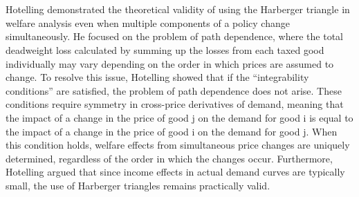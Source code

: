 \documentclass[a4paper]{article}
\begin{document}
\section{} %
Hotelling demonstrated the theoretical validity of using the Harberger triangle in welfare analysis even when multiple components of a policy change simultaneously.
He focused on the problem of path dependence, where the total deadweight loss calculated by summing up the losses from each taxed good individually may vary depending on the order in which prices are assumed to change.
To resolve this issue, Hotelling showed that if the “integrability conditions” are satisfied, the problem of path dependence does not arise.
These conditions require symmetry in cross-price derivatives of demand, meaning that the impact of a change in the price of good j on the demand for good i is equal to the impact of a change in the price of good i on the demand for good j.
When this condition holds, welfare effects from simultaneous price changes are uniquely determined, regardless of the order in which the changes occur.
Furthermore, Hotelling argued that since income effects in actual demand curves are typically small, the use of Harberger triangles remains practically valid.
\end{document}
